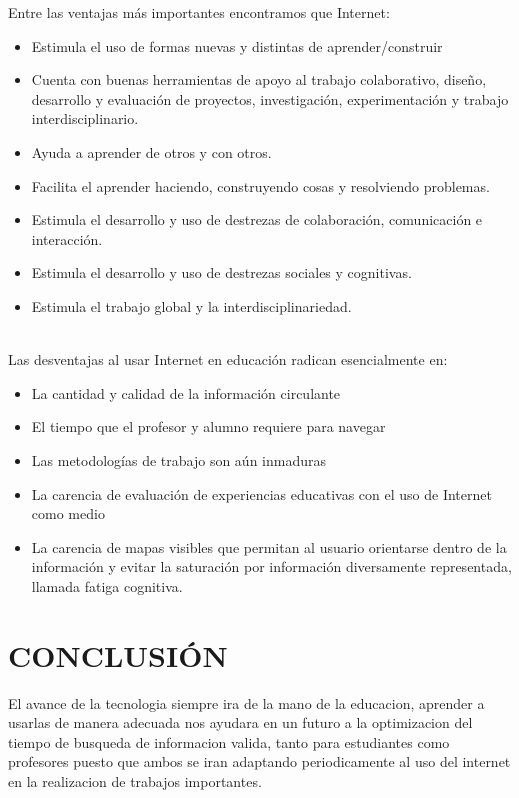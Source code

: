 \documentclass{bmcart}
\begin{document}
Entre las ventajas más importantes encontramos que Internet:
\begin{itemize}

\item Estimula el uso de formas nuevas y distintas de aprender/construir

\item Cuenta con buenas herramientas de apoyo al trabajo colaborativo, diseño, desarrollo y evaluación
de proyectos, investigación, experimentación y trabajo interdisciplinario.

\item Ayuda a aprender de otros y con otros.

\item Facilita el aprender haciendo, construyendo cosas y resolviendo problemas.

\item Estimula el desarrollo y uso de destrezas de colaboración, comunicación e interacción.

\item Estimula el desarrollo y uso de destrezas sociales y cognitivas.

\item Estimula el trabajo global y la interdisciplinariedad.\\ \\
\end{itemize}

Las desventajas al usar Internet en educación radican esencialmente en:
\begin{itemize}
	\item La cantidad y calidad de la información circulante

\item El tiempo que el profesor y alumno requiere para navegar

\item Las metodologías de trabajo son aún inmaduras

\item La carencia de evaluación de experiencias educativas con el uso de Internet como medio

\item La carencia de mapas visibles que permitan al usuario orientarse dentro de la información y
evitar la saturación por información diversamente representada, llamada fatiga cognitiva.
\end{itemize}
\section*{CONCLUSIÓN}
El avance de la tecnologia siempre ira de la mano de la educacion, aprender a usarlas de manera adecuada nos ayudara en un futuro a la optimizacion del tiempo de busqueda de informacion valida, tanto para estudiantes como profesores puesto que ambos se iran adaptando periodicamente al uso del internet en la realizacion de trabajos importantes.
\newpage
\end{document}
